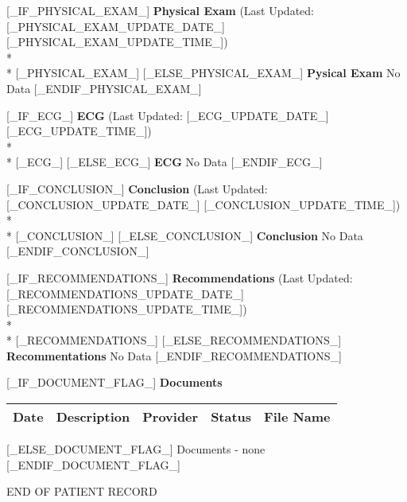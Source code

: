 \documentclass[10pt,letterpaper]{letter}
\begin{document}
[_IF_PHYSICAL_EXAM_]
\Large\textbf{Physical Exam} \small{(Last Updated: [_PHYSICAL_EXAM_UPDATE_DATE_] [_PHYSICAL_EXAM_UPDATE_TIME_])}
\\*\\*
\small{[_PHYSICAL_EXAM_]}
[_ELSE_PHYSICAL_EXAM_]
\Large\textbf{Pysical Exam} \small{No Data}
[_ENDIF_PHYSICAL_EXAM_]

[_IF_ECG_]
\Large\textbf{ECG} \small{(Last Updated: [_ECG_UPDATE_DATE_] [_ECG_UPDATE_TIME_])}
\\*\\*
\small{[_ECG_]}
[_ELSE_ECG_]
\Large\textbf{ECG} \small{No Data}
[_ENDIF_ECG_]

[_IF_CONCLUSION_]
\Large\textbf{Conclusion} \small{(Last Updated: [_CONCLUSION_UPDATE_DATE_] [_CONCLUSION_UPDATE_TIME_])}
\\*\\*
\small{[_CONCLUSION_]}
[_ELSE_CONCLUSION_]
\Large\textbf{Conclusion} \small{No Data}
[_ENDIF_CONCLUSION_]

[_IF_RECOMMENDATIONS_]
\Large\textbf{Recommendations} \small{(Last Updated: [_RECOMMENDATIONS_UPDATE_DATE_] [_RECOMMENDATIONS_UPDATE_TIME_])}
\\*\\*
\small{[_RECOMMENDATIONS_]}
[_ELSE_RECOMMENDATIONS_]
\Large\textbf{Recommentations} \small{No Data}
[_ENDIF_RECOMMENDATIONS_]

[_IF_DOCUMENT_FLAG_]
\Large\textbf{Documents}
\small{
\begin{longtable}{lllll}
\textbf{Date} & \textbf{Description} & \textbf{Provider} & \textbf{Status} & \textbf{File Name}\\
\hline
[_DOCUMENT_LIST_]
\end{longtable}
}
[_ELSE_DOCUMENT_FLAG_]
Documents - none
[_ENDIF_DOCUMENT_FLAG_]

END OF PATIENT RECORD
\end{document}
